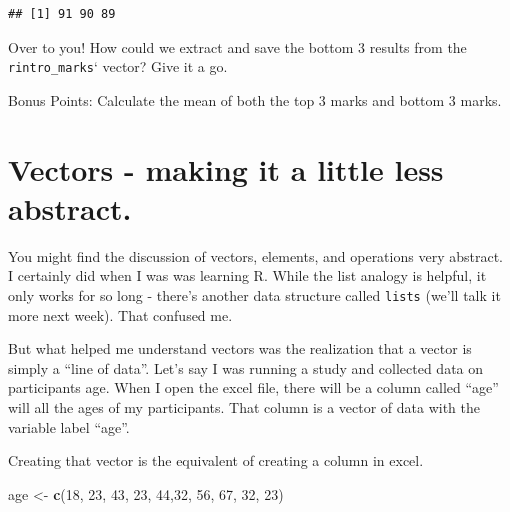 \documentclass[
]{book}
\newenvironment{Shaded}{\begin{snugshade}}{\end{snugshade}}
\newcommand{\DecValTok}[1]{\textcolor[rgb]{0.00,0.00,0.81}{#1}}
\newcommand{\FunctionTok}[1]{\textcolor[rgb]{0.13,0.29,0.53}{\textbf{#1}}}
\newcommand{\NormalTok}[1]{#1}
\newcommand{\OtherTok}[1]{\textcolor[rgb]{0.56,0.35,0.01}{#1}}
\begin{document}
\begin{verbatim}
## [1] 91 90 89
\end{verbatim}

Over to you! How could we extract and save the bottom 3 results from the \texttt{rintro\_marks}` vector? Give it a go.

Bonus Points: Calculate the mean of both the top 3 marks and bottom 3 marks.

\hypertarget{vectors---making-it-a-little-less-abstract.}{%
\section{Vectors - making it a little less abstract.}\label{vectors---making-it-a-little-less-abstract.}}

You might find the discussion of vectors, elements, and operations very abstract. I certainly did when I was was learning R. While the list analogy is helpful, it only works for so long - there's another data structure called \texttt{lists} (we'll talk it more next week). That confused me.

But what helped me understand vectors was the realization that a vector is simply a ``line of data''. Let's say I was running a study and collected data on participants age. When I open the excel file, there will be a column called ``age'' will all the ages of my participants. That column is a vector of data with the variable label ``age''.

Creating that vector is the equivalent of creating a column in excel.

\begin{Shaded}
\begin{Highlighting}[]
\NormalTok{age }\OtherTok{\textless{}{-}} \FunctionTok{c}\NormalTok{(}\DecValTok{18}\NormalTok{, }\DecValTok{23}\NormalTok{, }\DecValTok{43}\NormalTok{, }\DecValTok{23}\NormalTok{, }\DecValTok{44}\NormalTok{,}\DecValTok{32}\NormalTok{, }\DecValTok{56}\NormalTok{, }\DecValTok{67}\NormalTok{, }\DecValTok{32}\NormalTok{, }\DecValTok{23}\NormalTok{)}
\end{Highlighting}
\end{Shaded}
\end{document}
